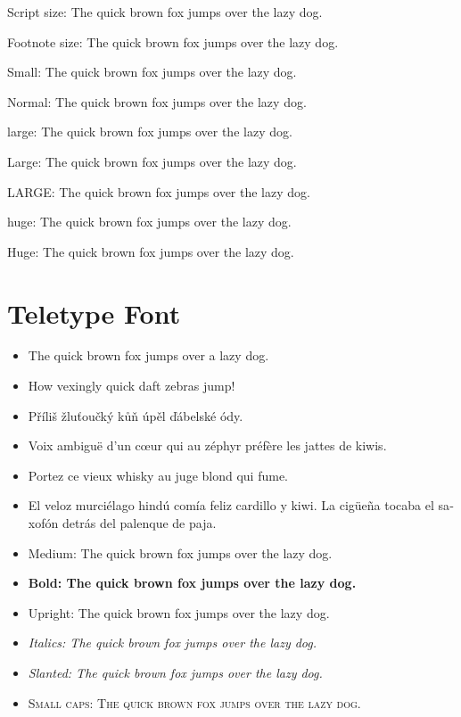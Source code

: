 {\scriptsize Script size: The quick brown fox jumps over the lazy dog.}

{\footnotesize Footnote size: The quick brown fox jumps over the lazy dog.}

{\small Small: The quick brown fox jumps over the lazy dog.}

{\normalsize Normal: The quick brown fox jumps over the lazy dog.}

{\large large: The quick brown fox jumps over the lazy dog.}

{\Large Large: The quick brown fox jumps over the lazy dog.}

{\LARGE LARGE: The quick brown fox jumps over the lazy dog.}

{\huge huge: The quick brown fox jumps over the lazy dog.}

{\Huge Huge: The quick brown fox jumps over the lazy dog.}

\section{Teletype Font}
\ttfamily
\blindtext
\begin{itemize}
    \item The quick brown fox jumps over a lazy dog.
    \item How vexingly quick daft zebras jump!
    \item \foreignlanguage{czech}{Příliš žluťoučký kůň úpěl ďábelské ódy.}
    \item \foreignlanguage{french}{Voix ambiguë d'un cœur qui au zéphyr préfère les jattes de kiwis.}
    \item \foreignlanguage{french}{Portez ce vieux whisky au juge blond qui fume.}
    \item \foreignlanguage{spanish}{El veloz murciélago hindú comía feliz cardillo y kiwi. La cigüeña tocaba el saxofón detrás del palenque de paja.}
\end{itemize}
\begin{itemize}
    \item \textmd{Medium: The quick brown fox jumps over the lazy dog.}
    \item \textbf{Bold: The quick brown fox jumps over the lazy dog.}
    \item \textup{Upright: The quick brown fox jumps over the lazy dog.}
    \item \textit{Italics: The quick brown fox jumps over the lazy dog.}
    \item \textsl{Slanted: The quick brown fox jumps over the lazy dog.}
    \item \textsc{Small caps: The quick brown fox jumps over the lazy dog.}
\end{itemize}

